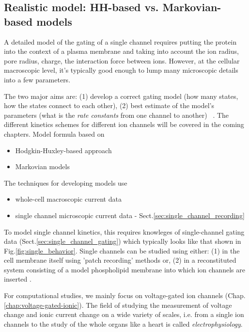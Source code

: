 \subsection{Realistic model: HH-based vs. Markovian-based models}

A detailed model of the gating of a single channel requires putting the
protein into the context of a plasma membrane and taking into account the ion
radius, pore radius, charge, the interaction force between ions.
However, at the cellular macroscopic level, it's typically good enough to lump
many microscopic details into a few parameters.


The two major aims are: (1) develop a correct gating model (how many states, how
the states connect to each other), (2) best estimate of the model's parameters
(what is the {\it rate constants} from one channel to another)
~\citep{ball1989icg}. The different kinetics schemes for different ion channels
will be covered in the coming chapters.
Model formula based on
\begin{itemize}
  \item Hodgkin-Huxley-based approach
  \item Markovian models
\end{itemize}


The techniques for developing models use
\begin{itemize}
  \item whole-cell macroscopic current data
  \item single channel microscopic current data - Sect.\ref{sec:single_channel_recording}
\end{itemize}

To model single channel kinetics, this requires knowleges of single-channel
gating data (Sect.\ref{sec:single_channel_gating}) which typically looks like
that shown in Fig.\ref{fig:single_behavior}. Single channels can be studied
using either: (1) in the cell membrane itself using 'patch recording' methods
or, (2) in a reconstituted system consisting of a model phospholipid membrane
into which ion channels are inserted \citep{sakmann1983, miller1986}.

For computational studies, we mainly focus on voltage-gated ion channels
(Chap.\ref{chap:voltage-gated-ionic}). The field of studying the measurement of
voltage change and ionic current change on a wide variety of scales, i.e. from a
single ion channels to the study of the whole organs like a heart is called {\it
electrophysiology}.






